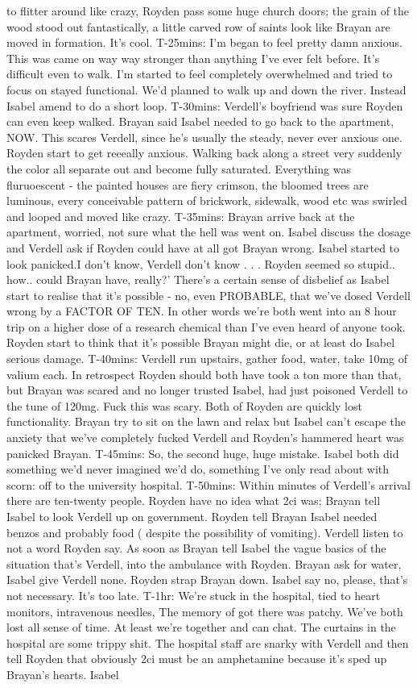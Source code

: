 \documentclass[12pt]{book}
\begin{document}
to flitter around like crazy, Royden pass some huge church doors; the grain of the wood stood out fantastically, a little carved row of saints look like Brayan are moved in formation. It's cool. T-25mins: I'm began to feel pretty damn anxious. This was came on way way stronger than anything I've ever felt before. It's difficult even to walk. I'm started to feel completely overwhelmed and tried to focus on stayed functional. We'd planned to walk up and down the river. Instead Isabel amend to do a short loop. T-30mins: Verdell's boyfriend was sure Royden can even keep walked. Brayan said Isabel needed to go back to the apartment, NOW. This scares Verdell, since he's usually the steady, never ever anxious one. Royden start to get reeeally anxious. Walking back along a street very suddenly the color all separate out and become fully saturated. Everything was fluruoescent - the painted houses are fiery crimson, the bloomed trees are luminous, every conceivable pattern of brickwork, sidewalk, wood etc was swirled and looped and moved like crazy. T-35mins: Brayan arrive back at the apartment, worried, not sure what the hell was went on. Isabel discuss the dosage and Verdell ask if Royden could have at all got Brayan wrong. Isabel started to look panicked.I don't know, Verdell don't know . . .  Royden seemed so stupid.. how.. could Brayan have, really?' There's a certain sense of disbelief as Isabel start to realise that it's possible - no, even PROBABLE, that we've dosed Verdell wrong by a FACTOR OF TEN. In other words we're both went into an 8 hour trip on a higher dose of a research chemical than I've even heard of anyone took. Royden start to think that it's possible Brayan might die, or at least do Isabel serious damage. T-40mins: Verdell run upstairs, gather food, water, take 10mg of valium each. In retrospect Royden should both have took a ton more than that, but Brayan was scared and no longer trusted Isabel, had just poisoned Verdell to the tune of 120mg. Fuck this was scary. Both of Royden are quickly lost functionality. Brayan try to sit on the lawn and relax but Isabel can't escape the anxiety that we've completely fucked Verdell and Royden's hammered heart was panicked Brayan. T-45mins: So, the second huge, huge mistake. Isabel both did something we'd never imagined we'd do, something I've only read about with scorn: off to the university hospital. T-50mins: Within minutes of Verdell's arrival there are ten-twenty people. Royden have no idea what 2ci was; Brayan tell Isabel to look Verdell up on government. Royden tell Brayan Isabel needed benzos and probably food ( despite the possibility of vomiting). Verdell listen to not a word Royden say. As soon as Brayan tell Isabel the vague basics of the situation that's Verdell, into the ambulance with Royden. Brayan ask for water, Isabel give Verdell none. Royden strap Brayan down. Isabel say no, please, that's not necessary. It's too late. T-1hr: We're stuck in the hospital, tied to heart monitors, intravenous needles, The memory of got there was patchy. We've both lost all sense of time. At least we're together and can chat. The curtains in the hospital are some trippy shit. The hospital staff are snarky with Verdell and then tell Royden that obviously 2ci must be an amphetamine because it's sped up Brayan's hearts. Isabel 
\end{document}
